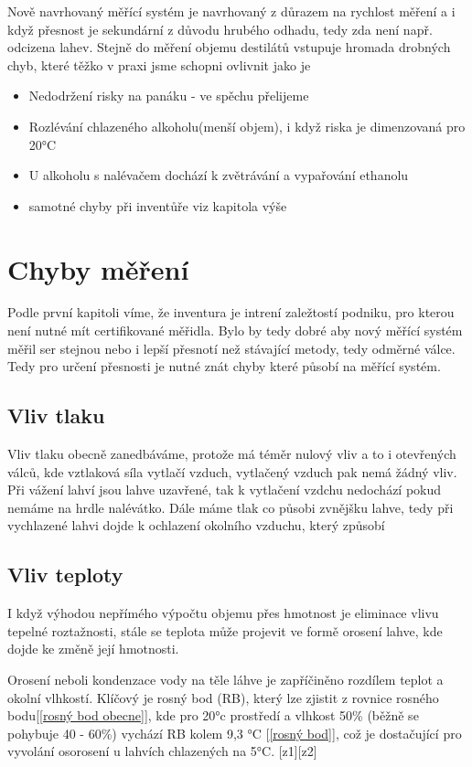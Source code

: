 Nově navrhovaný měřící systém je navrhovaný z důrazem na rychlost měření a i když přesnost je sekundární z důvodu hrubého odhadu, tedy zda není např. odcizena lahev. Stejně do měření objemu destilátů vstupuje hromada drobných chyb, které těžko v praxi jsme schopni ovlivnit jako je
\begin{itemize}
    \item Nedodržení risky na panáku - ve spěchu přelijeme
    \item Rozlévání chlazeného alkoholu(menší objem), i když riska je dimenzovaná pro 20°C
    \item U alkoholu s nalévačem dochází k zvětrávání a vypařování ethanolu
    \item samotné chyby při inventůře viz kapitola výše
\end{itemize}

\section{Chyby měření}
Podle první kapitoli víme, že inventura je intrení zaležtostí podniku, pro kterou není nutné mít certifikované měřidla. Bylo by tedy dobré aby nový měřící systém měřil ser stejnou nebo i lepší přesnotí než stávající metody, tedy odměrné válce. Tedy pro určení přesnosti je nutné znát chyby které působí na měřící systém.
\subsection{Vliv tlaku}
Vliv tlaku obecně zanedbáváme, protože má téměr nulový vliv a to i otevřených válců, kde vztlaková síla vytlačí vzduch, vytlačený vzduch pak nemá žádný vliv. Při vážení lahví jsou lahve uzavřené, tak k vytlačení vzdchu nedochází pokud nemáme na hrdle nalévátko. Dále máme tlak co působi zvnějšku lahve, tedy při vychlazené lahvi dojde k ochlazení okolního vzduchu, který způsobí 

\subsection{Vliv teploty}
I když výhodou nepřímého výpočtu objemu přes hmotnost je eliminace vlivu tepelné roztažnosti, stále se teplota může projevit ve formě orosení lahve, kde dojde ke změně její hmotnosti.

Orosení neboli kondenzace vody na těle láhve je zapříčiněno rozdílem teplot a okolní vlhkostí. Klíčový je rosný bod (RB), který lze zjistit z rovnice rosného bodu[\ref{rosný bod obecne}], kde pro 20°c prostředí a vlhkost 50\% (běžně se pohybuje 40 - 60\%) vychází RB kolem 9,3 °C [\ref{rosný bod}], což je dostačující pro vyvolání osorosení u lahvích chlazených na 5°C. [z1][z2]

